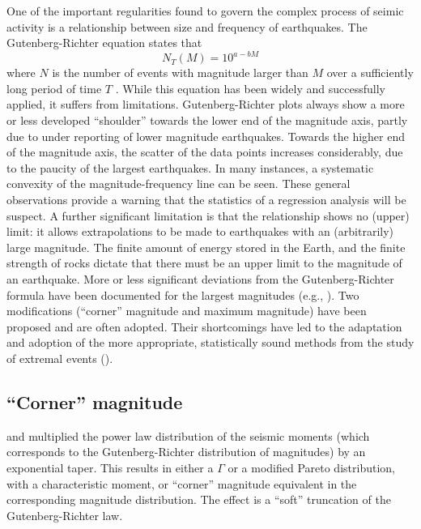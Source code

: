 \documentclass{report}
\begin{document}
One of the important regularities found to govern the complex
process of seimic activity is a relationship between size and
frequency of earthquakes. The Gutenberg-Richter equation states
that 
\begin{equation}
  \label{eq:gutenberg-richter}
N_T(M) = 10^{a - b M} 
\end{equation}
where $N$ is the number of events with magnitude larger than $M$ over
a sufficiently long period of time $T$
\cite{gutenberg-richter44:frequency}. While this equation has been
widely and successfully applied, it suffers from limitations.
Gutenberg-Richter plots always show a more or less developed
``shoulder'' towards the lower end of the magnitude axis, partly due
to under reporting of lower magnitude earthquakes. Towards the higher
end of the magnitude axis, the scatter of the data points increases
considerably, due to the paucity of the largest earthquakes. In many
instances, a systematic convexity of the magnitude-frequency line can
be seen. These general observations provide a warning that the
statistics of a regression analysis will be suspect.  A further
significant limitation is that the relationship shows no (upper)
limit: it allows extrapolations to be made to earthquakes with an
(arbitrarily) large magnitude. The finite amount of energy stored in
the Earth, and the finite strength of rocks dictate that there must be
an upper limit to the magnitude of an earthquake. More or less
significant deviations from the Gutenberg-Richter formula have been
documented for the largest magnitudes (e.g.,
). Two modifications (``corner''
magnitude and maximum magnitude) have been proposed and are often
adopted. Their shortcomings have led to the adaptation and adoption of
the more appropriate, statistically sound methods from the study of
extremal events (\cite{embrechts_al97:extremal}).

\subsection{“Corner” magnitude}

 and
 multiplied the power law distribution
of the seismic moments (which corresponds to the Gutenberg-Richter
distribution of magnitudes) by an exponential taper. This results in
either a $\Gamma$ or a modified Pareto distribution, with a characteristic
moment, or ``corner'' magnitude equivalent in the corresponding
magnitude distribution. The effect is a ``soft'' truncation of the
Gutenberg-Richter law.
\end{document}
